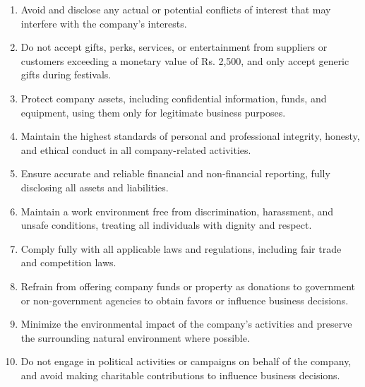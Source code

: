 \begin{enumerate}
	\item Avoid and disclose any actual or potential conflicts of interest that may interfere with the company's interests.
	\item Do not accept gifts, perks, services, or entertainment from suppliers or customers exceeding a monetary value of Rs. 2,500, and only accept generic gifts during festivals.
	\item Protect company assets, including confidential information, funds, and equipment, using them only for legitimate business purposes.
	\item Maintain the highest standards of personal and professional integrity, honesty, and ethical conduct in all company-related activities.
	\item Ensure accurate and reliable financial and non-financial reporting, fully disclosing all assets and liabilities.
	\item Maintain a work environment free from discrimination, harassment, and unsafe conditions, treating all individuals with dignity and respect.
	\item Comply fully with all applicable laws and regulations, including fair trade and competition laws.
	\item Refrain from offering company funds or property as donations to government or non-government agencies to obtain favors or influence business decisions.
	\item Minimize the environmental impact of the company's activities and preserve the surrounding natural environment where possible.
	\item Do not engage in political activities or campaigns on behalf of the company, and avoid making charitable contributions to influence business decisions.
\end{enumerate}